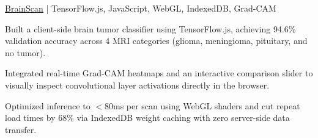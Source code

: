 \begin{cvproject}{\href{https://grvchnx.github.io/brainscan/}{\uline{BrainScan}} | TensorFlow.js, JavaScript, WebGL, IndexedDB, Grad-CAM}{}
    \item Built a client-side brain tumor classifier using TensorFlow.js, achieving 94.6\% validation accuracy across 4 MRI categories (glioma, meningioma, pituitary, and no tumor).
    \item Integrated real-time Grad-CAM heatmaps and an interactive comparison slider to visually inspect convolutional layer activations directly in the browser.
    \item Optimized inference to $<$80ms per scan using WebGL shaders and cut repeat load times by 68\% via IndexedDB weight caching with zero server-side data transfer.
\end{cvproject}